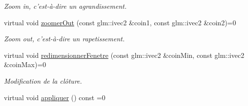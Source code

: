 \begin{DoxyCompactItemize}
\begin{DoxyCompactList}\small\item\em Zoom in, c'est-\/à-\/dire un agrandissement. \end{DoxyCompactList}\item 
\hypertarget{classvue_1_1_projection_ae96d44a2ab4199dead6401c9e3d56687}{virtual void \hyperlink{classvue_1_1_projection_ae96d44a2ab4199dead6401c9e3d56687}{zoomer\-Out} (const glm\-::ivec2 \&coin1, const glm\-::ivec2 \&coin2)=0}\label{classvue_1_1_projection_ae96d44a2ab4199dead6401c9e3d56687}

\begin{DoxyCompactList}\small\item\em Zoom out, c'est-\/à-\/dire un rapetissement. \end{DoxyCompactList}\item 
\hypertarget{classvue_1_1_projection_a27a880285b985a370000944044f07a21}{virtual void \hyperlink{classvue_1_1_projection_a27a880285b985a370000944044f07a21}{redimensionner\-Fenetre} (const glm\-::ivec2 \&coin\-Min, const glm\-::ivec2 \&coin\-Max)=0}\label{classvue_1_1_projection_a27a880285b985a370000944044f07a21}

\begin{DoxyCompactList}\small\item\em Modification de la clôture. \end{DoxyCompactList}\item 
\hypertarget{classvue_1_1_projection_a88c8ee9ae0a1d08b48b94f6c093ee563}{virtual void \hyperlink{classvue_1_1_projection_a88c8ee9ae0a1d08b48b94f6c093ee563}{appliquer} () const =0}\label{classvue_1_1_projection_a88c8ee9ae0a1d08b48b94f6c093ee563}


\end{DoxyCompactItemize}

